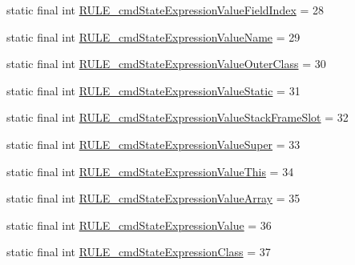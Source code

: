 \begin{DoxyCompactItemize}
\item 
static final int \hyperlink{classgov_1_1nasa_1_1jpf_1_1inspector_1_1server_1_1expression_1_1parser_1_1_expression_grammar_parser_a54d8da060526cc832c7024e41159caa4}{R\+U\+L\+E\+\_\+cmd\+State\+Expression\+Value\+Field\+Index} = 28
\item 
static final int \hyperlink{classgov_1_1nasa_1_1jpf_1_1inspector_1_1server_1_1expression_1_1parser_1_1_expression_grammar_parser_aa79865a7fa8f7e73f52ecb9ea357a1a4}{R\+U\+L\+E\+\_\+cmd\+State\+Expression\+Value\+Name} = 29
\item 
static final int \hyperlink{classgov_1_1nasa_1_1jpf_1_1inspector_1_1server_1_1expression_1_1parser_1_1_expression_grammar_parser_acfae7005ac7c8362224a52d7fe797cc4}{R\+U\+L\+E\+\_\+cmd\+State\+Expression\+Value\+Outer\+Class} = 30
\item 
static final int \hyperlink{classgov_1_1nasa_1_1jpf_1_1inspector_1_1server_1_1expression_1_1parser_1_1_expression_grammar_parser_acd6ec78e49c782d5b0ca85716b78a319}{R\+U\+L\+E\+\_\+cmd\+State\+Expression\+Value\+Static} = 31
\item 
static final int \hyperlink{classgov_1_1nasa_1_1jpf_1_1inspector_1_1server_1_1expression_1_1parser_1_1_expression_grammar_parser_ad2d0425cedd032e96c56b881d8e820a7}{R\+U\+L\+E\+\_\+cmd\+State\+Expression\+Value\+Stack\+Frame\+Slot} = 32
\item 
static final int \hyperlink{classgov_1_1nasa_1_1jpf_1_1inspector_1_1server_1_1expression_1_1parser_1_1_expression_grammar_parser_a82d377f6d153352cce5e4f9e02ae1a6c}{R\+U\+L\+E\+\_\+cmd\+State\+Expression\+Value\+Super} = 33
\item 
static final int \hyperlink{classgov_1_1nasa_1_1jpf_1_1inspector_1_1server_1_1expression_1_1parser_1_1_expression_grammar_parser_a05ebcff6095a1111ea18c23ed83898fd}{R\+U\+L\+E\+\_\+cmd\+State\+Expression\+Value\+This} = 34
\item 
static final int \hyperlink{classgov_1_1nasa_1_1jpf_1_1inspector_1_1server_1_1expression_1_1parser_1_1_expression_grammar_parser_a8296432b43cef8e3962833d4cb9ef032}{R\+U\+L\+E\+\_\+cmd\+State\+Expression\+Value\+Array} = 35
\item 
static final int \hyperlink{classgov_1_1nasa_1_1jpf_1_1inspector_1_1server_1_1expression_1_1parser_1_1_expression_grammar_parser_ab7a82f21ad4fdbe685351651c0fce7a8}{R\+U\+L\+E\+\_\+cmd\+State\+Expression\+Value} = 36
\item 
static final int \hyperlink{classgov_1_1nasa_1_1jpf_1_1inspector_1_1server_1_1expression_1_1parser_1_1_expression_grammar_parser_ae2659147bb430d58143ab16a6eb73b15}{R\+U\+L\+E\+\_\+cmd\+State\+Expression\+Class} = 37

\end{DoxyCompactItemize}
